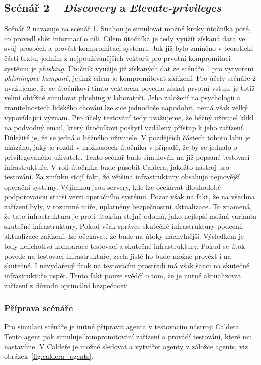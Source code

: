 \subsection{Scénář 2 -- \textit{Discovery} a \textit{Elevate-privileges}}\label{subsec:scenar-2}
Scénář 2 navazuje na scénář 1.
Snahou je simulovat možné kroky útočníka poté, co provedl sběr informací o cíli.
Cílem útočníka je tedy využít získaná data ve svůj prospěch a provést kompromitaci systému.
Jak již bylo zmíněno v teoretické části textu, jedním z nejpoužívanějších vektorů pro prvotní kompromitaci systému je \textit{phishing}.
Útočník využije již získaných dat ze scénáře 1 pro vytvoření \textit{phishingové kampaně}, jejímž cílem je kompromitovat zařízení.
Pro účely scénáře 2 uvažujeme, že se útočníkovi tímto vektorem povedlo získat prvotní vstup, je totiž velmi obtížné simulovat phishing v laboratoři.
Jeho založení na psychologii a zranitelnostech lidského chování lze sice jednoduše napodobit, nemá však velký vypovídající význam.
Pro účely testování tedy uvažujeme, že běžný uživatel klikl na podvodný email, který útočníkovi poskytl vzdálený přístup k jeho zařízení.
Důležité je, že se jedná o běžného uživatele.
V pozdějších částech tohoto labu je ukázáno, jaký je rozdíl v možnostech útočníka v případě, že by se jednalo o privilegovaného uživatele.
Tento scénář bude simulován na již popsané testovací infrastruktuře.
V roli útočníka bude působit Caldera, jakožto nástroj pro testování.
Za zmínku stojí fakt, že většina infrastruktury obsahuje nejnovější operační systémy.
Výjimkou jsou servery, kde lze očekávat dlouhodobě podporovanou starší verzi operačního systému.
Pozor však na fakt, že na všechna zařízení byly, v rozumné míře, uplatněny bezpečnostní aktualizace.
To znamená, že tato infrastruktura je proti útokům stejně odolná, jako nejlepší možná varianta skutečné infrastruktury.
Pokud však správce skutečné infrastruktury podcenil aktualizace zařízení, lze očekávat, že bude na útoky náchylnější.
Výsledkem je tedy nelichotivá komparace testovací a skutečné infrastruktury.
Pokud se útok povede na testovací infrastruktuře, zcela jistě ho bude možné provézt i na skutečné.
I nevydařený útok na testovacím prostředí má však šanci na skutečné infrastruktuře uspět.
Tento fakt pouze svědčí o tom, že je nutné aktualizovat zařízení z důvodu optimální bezpečnosti.


\subsubsection{Příprava scénáře}
Pro simulaci scénáře je nutné připravit agenta v testovacím nástroji Caldera.
Tento agent pak simuluje kompromitování zařízení a provádí testování, které mu nastavíme.
V Caldeře je možné sledovat a vytvářet agenty v záložce agents, viz obrázek~\ref{fig:caldera_agents}.

